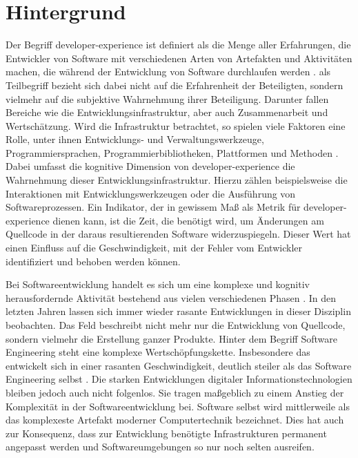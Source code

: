 \section{Hintergrund}
\label{sec:01-01_background}

Der Begriff \Gls{developer-experience} ist definiert als die Menge aller Erfahrungen, die Entwickler von Software mit verschiedenen Arten von Artefakten und Aktivitäten machen, die während der Entwicklung von Software durchlaufen werden \cite{017:Developer-Experience-Concept-and-Definition,100:Developer-Experience-Glueckliche-Entwickler-schreiben-besseren-Code}.  als Teilbegriff bezieht sich dabei nicht auf die Erfahrenheit der Beteiligten, sondern vielmehr auf die subjektive Wahrnehmung ihrer Beteiligung. Darunter fallen Bereiche wie die Entwicklungsinfrastruktur, aber auch Zusammenarbeit und Wertschätzung. \cite{017:Developer-Experience-Concept-and-Definition} Wird die Infrastruktur betrachtet, so spielen viele Faktoren eine Rolle, unter ihnen Entwicklungs- und Verwaltungswerkzeuge, Programmiersprachen, Programmierbibliotheken, Plattformen und Methoden \cite{100:Developer-Experience-Glueckliche-Entwickler-schreiben-besseren-Code}. Dabei umfasst die kognitive Dimension von \Gls{developer-experience} die Wahrnehmung dieser Entwicklungsinfrastruktur. Hierzu zählen beispielsweise die Interaktionen mit Entwicklungswerkzeugen oder die Ausführung von Softwareprozessen. \cite{017:Developer-Experience-Concept-and-Definition} Ein Indikator, der in gewissem Maß als Metrik für \Gls{developer-experience} dienen kann, ist die Zeit, die benötigt wird, um Änderungen am Quellcode in der daraus resultierenden Software widerzuspiegeln. Dieser Wert hat einen Einfluss auf die Geschwindigkeit, mit der Fehler vom Entwickler identifiziert und behoben werden können. \cite{100:Developer-Experience-Glueckliche-Entwickler-schreiben-besseren-Code}

Bei Softwareentwicklung handelt es sich um eine komplexe und kognitiv herausfordernde Aktivität bestehend aus vielen verschiedenen Phasen \cite{014:Managing-Container-based-Software-Development-Environments}. In den letzten Jahren lassen sich immer wieder rasante Entwicklungen in dieser Disziplin beobachten. Das Feld beschreibt nicht mehr nur die Entwicklung von Quellcode, sondern vielmehr die Erstellung ganzer Produkte. Hinter dem Begriff Software Engineering steht eine komplexe Wertschöpfungskette. Insbesondere das  entwickelt sich in einer rasanten Geschwindigkeit, deutlich steiler als das Software Engineering selbst \cite{026:Some-Trends-in-Web-Application-Development}. Die starken Entwicklungen digitaler Informationstechnologien bleiben jedoch auch nicht folgenlos. Sie tragen maßgeblich zu einem Anstieg der Komplexität in der Softwareentwicklung bei. Software selbst wird mittlerweile als das komplexeste Artefakt moderner Computertechnik bezeichnet. Dies hat auch zur Konsequenz, dass zur Entwicklung benötigte Infrastrukturen permanent angepasst werden und Softwareumgebungen so nur noch selten ausreifen. \cite{018:Software-Development-Productivity}

